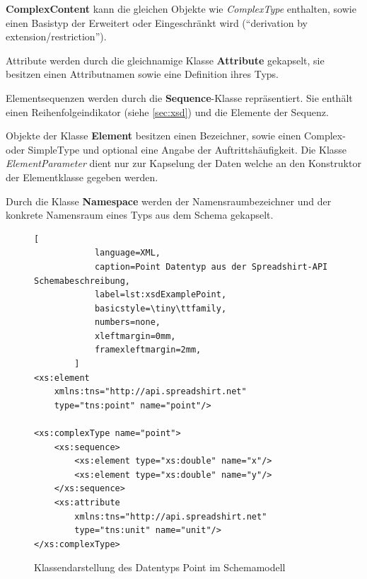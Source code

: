 \textbf{ComplexContent} kann die gleichen Objekte wie \emph{ComplexType} enthalten, sowie einen Basistyp der Erweitert oder Eingeschränkt wird (\enquote{derivation by extension/restriction}).

Attribute werden durch die gleichnamige Klasse \textbf{Attribute} gekapselt, sie besitzen einen Attributnamen sowie eine Definition ihres Typs.

Elementsequenzen werden durch die \textbf{Sequence}-Klasse repräsentiert. Sie enthält einen Reihenfolgeindikator (siehe \cref{sec:xsd}) und die Elemente der Sequenz.

Objekte der Klasse \textbf{Element} besitzen einen Bezeichner, sowie einen Complex- oder SimpleType und optional eine Angabe der Auftrittshäufigkeit. Die Klasse \emph{ElementParameter} dient nur zur Kapselung der Daten welche an den Konstruktor der Elementklasse gegeben werden.

Durch die Klasse \textbf{Namespace} werden der Namensraumbezeichner und der konkrete Namensraum eines Typs aus dem Schema gekapselt. 


\begin{figure}[ht]
    \centering
    \begin{minipage}[b]{0.50\linewidth}
        \begin{lstlisting}[
            language=XML,
            caption=Point Datentyp aus der Spreadshirt-API Schemabeschreibung,
            label=lst:xsdExamplePoint,    
            basicstyle=\tiny\ttfamily,
            numbers=none,
            xleftmargin=0mm,
            framexleftmargin=2mm,
        ]
<xs:element 
    xmlns:tns="http://api.spreadshirt.net" 
    type="tns:point" name="point"/>

<xs:complexType name="point">
    <xs:sequence>
        <xs:element type="xs:double" name="x"/>
        <xs:element type="xs:double" name="y"/>
    </xs:sequence>
    <xs:attribute 
        xmlns:tns="http://api.spreadshirt.net" 
        type="tns:unit" name="unit"/>
</xs:complexType>
        \end{lstlisting}
    \end{minipage}
    \quad    
    \begin{minipage}[b]{0.45\linewidth}
        \caption{Klassendarstellung des Datentyps Point im Schemamodell}
    \end{minipage}
\end{figure}